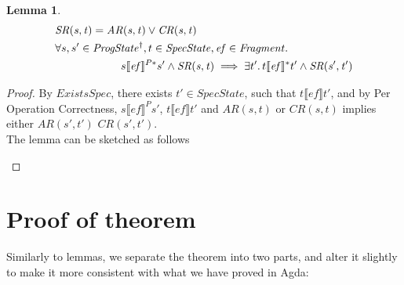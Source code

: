 \documentclass[a4paper,11pt]{article}
\newtheorem{lemma}[theorem]{Lemma}
\theoremstyle{definition}
\begin{document}
\begin{lemma}\label{lemma-1}
	\begin{align*}
		&\mathit{SR(s, t)} = \mathit{AR(s, t)} \lor \mathit{CR(s, t)}\\
		&\forall s, s' \in \mathit{ProgState^\dagger}, t \in \mathit{SpecState}, \mathit{ef} \in \mathit{Fragment} \ldotp\\
		&\qquad \qquad \qquad s \llbracket \mathit{ef} \rrbracket^{P*} s'  \land \mathit{SR(s, t)} \implies \exists t' \ldotp t\llbracket \mathit{ef} \rrbracket^* t' \land \mathit{SR(s', t')} \\
	\end{align*}
\end{lemma}
\begin{proof}
	By $\mathit{ExistsSpec}$, there exists $t' \in SpecState$, such that $t \llbracket \mathit{ef} \rrbracket t'$, and by Per Operation Correctness, $s \llbracket \mathit{ef} \rrbracket^P s'$, $t \llbracket \mathit{ef} \rrbracket t'$ and $\mathit{AR(s, t)}$ or $\mathit{CR(s, t)}$ implies either $\mathit{AR(s', t')}$ $\mathit{CR(s', t')}$. \\
	The lemma can be sketched as follows
	\begin{figure} [h] \centering
{}
	\end{figure}
\end{proof}

\section{Proof of theorem}

Similarly to lemmas, we separate the theorem into two parts, and alter it slightly to make it more consistent with what we have proved in Agda:
\end{document}
